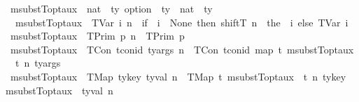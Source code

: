 \begin{isabellebody}
\ msubstT{\isacharunderscore}{\kern0pt}opt{\isacharunderscore}{\kern0pt}aux\ {\isacharcolon}{\kern0pt}{\isacharcolon}{\kern0pt}\ {\isachardoublequoteopen}{\isacharparenleft}{\kern0pt}nat\ {\isasymRightarrow}\ ty\ option{\isacharparenright}{\kern0pt}\ {\isasymRightarrow}\ ty\ {\isasymRightarrow}\ nat\ {\isasymRightarrow}\ ty{\isachardoublequoteclose}\isanewline
\ \ \isanewline
\ \ {\isachardoublequoteopen}msubstT{\isacharunderscore}{\kern0pt}opt{\isacharunderscore}{\kern0pt}aux\ {\isasymsigma}\ {\isacharparenleft}{\kern0pt}TVar\ i{\isacharparenright}{\kern0pt}\ n\ {\isacharequal}{\kern0pt}\ {\isacharparenleft}{\kern0pt}if\ {\isasymsigma}\ i\ {\isasymnoteq}\ None\ then\ shiftT\ n\ {}\ {\isacharparenleft}{\kern0pt}the\ {\isacharparenleft}{\kern0pt}{\isasymsigma}\ i{\isacharparenright}{\kern0pt}{\isacharparenright}{\kern0pt}\ else\ TVar\ i{\isacharparenright}{\kern0pt}{\isachardoublequoteclose}\isanewline
{\isacharbar}{\kern0pt}\ {\isachardoublequoteopen}msubstT{\isacharunderscore}{\kern0pt}opt{\isacharunderscore}{\kern0pt}aux\ {\isasymsigma}\ {\isacharparenleft}{\kern0pt}TPrim\ p{\isacharparenright}{\kern0pt}\ n\ {\isacharequal}{\kern0pt}\ TPrim\ p{\isachardoublequoteclose}\isanewline
{\isacharbar}{\kern0pt}\ {\isachardoublequoteopen}msubstT{\isacharunderscore}{\kern0pt}opt{\isacharunderscore}{\kern0pt}aux\ {\isasymsigma}\ {\isacharparenleft}{\kern0pt}TCon\ tcon{\isacharunderscore}{\kern0pt}id\ ty{\isacharunderscore}{\kern0pt}args{\isacharparenright}{\kern0pt}\ n\ {\isacharequal}{\kern0pt}\ TCon\ tcon{\isacharunderscore}{\kern0pt}id\ {\isacharparenleft}{\kern0pt}map\ {\isacharparenleft}{\kern0pt}{\isasymlambda}t{\isachardot}{\kern0pt}\ msubstT{\isacharunderscore}{\kern0pt}opt{\isacharunderscore}{\kern0pt}aux\ {\isasymsigma}\ t\ n{\isacharparenright}{\kern0pt}\ ty{\isacharunderscore}{\kern0pt}args{\isacharparenright}{\kern0pt}{\isachardoublequoteclose}\isanewline
{\isacharbar}{\kern0pt}\ {\isachardoublequoteopen}msubstT{\isacharunderscore}{\kern0pt}opt{\isacharunderscore}{\kern0pt}aux\ {\isasymsigma}\ {\isacharparenleft}{\kern0pt}TMap\ ty{\isacharunderscore}{\kern0pt}key\ ty{\isacharunderscore}{\kern0pt}val{\isacharparenright}{\kern0pt}\ n\ {\isacharequal}{\kern0pt}\ {\isacharparenleft}{\kern0pt}TMap\ {\isacharparenleft}{\kern0pt}{\isacharparenleft}{\kern0pt}{\isasymlambda}t{\isachardot}{\kern0pt}\ msubstT{\isacharunderscore}{\kern0pt}opt{\isacharunderscore}{\kern0pt}aux\ {\isasymsigma}\ t\ n{\isacharparenright}{\kern0pt}\ ty{\isacharunderscore}{\kern0pt}key{\isacharparenright}{\kern0pt}\ {\isacharparenleft}{\kern0pt}msubstT{\isacharunderscore}{\kern0pt}opt{\isacharunderscore}{\kern0pt}aux\ {\isasymsigma}\ ty{\isacharunderscore}{\kern0pt}val\ n{\isacharparenright}{\kern0pt}{\isacharparenright}{\kern0pt}{\isachardoublequoteclose}\isanewline

\end{isabellebody}
